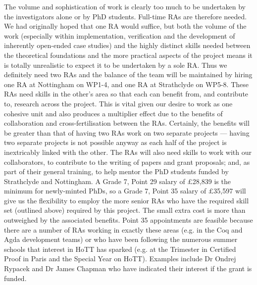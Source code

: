 \documentclass[a4paper,11pt]{article}
\begin{document}
The volume and sophistication of work is clearly too much to be
undertaken by the investigators alone or by PhD students. Full-time
RAs are therefore needed. We had originally hoped that one RA would
suffice, but both the volume of the work (especially within
implementation, verification and the development of inherently
open-ended case studies) and the highly distinct skills needed between
the theoretical foundations and the more practical aspects of the
project means it is totally unrealistic to expect it to be
undertaken by a sole RA. Thus we definitely need two RAs and the
balance of the team will be maintained by hiring one RA at Nottingham
on WP1-4, and one RA at Strathclyde on WP5-8. These RAs need 
skills in the other's area so that each can benefit from, and
contribute to, research across the project. This is vital given our
desire to work as one cohesive unit and also produces a multiplier
effect due to the benefits of collaboration and cross-fertilisation
between the RAs. Certainly, the benefits will be greater than that of
having two RAs work on two separate projects --- having two separate
projects is not possible anyway as each half of the project is
inextricably linked with the other. The RAs will also need skills to
work with our collaborators, to contribute to the writing of papers
and grant proposals; and, as part of their general training, to help
mentor the PhD students funded by Strathclyde and Nottingham.  A Grade
7, Point 29 salary of $\pounds$28,839 is the minimum for newly-minted
PhDs, so a Grade 7, Point 35 salary of $\pounds$35,597 will give us
the flexibility to employ the more senior RAs who have the required
skill set (outlined above) required by this project. The small extra
cost is more than outweighed by the associated benefits. Point 35
appointments are feasible because there are a number of RAs working in
exactly these areas (e.g. in the Coq and Agda development teams) or
who have been following the numerous summer schools that interest in
HoTT has sparked (e.g. at the Trimester in Certified Proof in Paris
and the Special Year on HoTT). Examples include Dr Ondrej Rypacek and
Dr James Chapman who have indicated their interest if the grant is
funded.  \vspace{0.02in}
\end{document}
